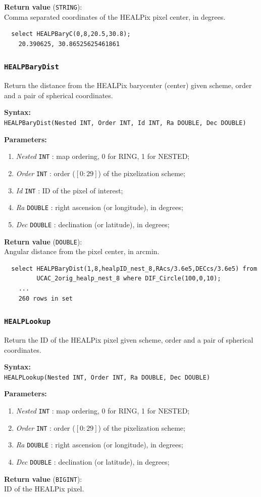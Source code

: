 \documentclass[10pt,titlepage]{article}
\newcommand{\syntax}[1]
{
  \bigskip
  \noindent
  \textbf{Syntax:} \\ 
  \indent \texttt{#1}
}
\newenvironment{parameters}
{
  \medskip
  \noindent
  \textbf{Parameters:}
  \begin{enumerate}
}
{
  \end{enumerate}
}
\newcommand{\param}[2]
{
  \item \textit{#1} \texttt{#2} 
}
\newcommand{\return}[1]
{
  \medskip
  \noindent
  \textbf{Return value} (\texttt{#1}): \\
  \indent
}
\newcommand{\example}
{
\medskip
\noindent{\textbf{Example:}}
}
\begin{document}
\return{STRING} Comma separated coordinates of the HEALPix pixel center, in
  degrees.

\example
%
\begin{verbatim}
  select HEALPBaryC(0,8,20.5,30.8);
    20.390625, 30.86525625461861
\end{verbatim}
%
%

\subsubsection{{\tt HEALPBaryDist}}
Return the distance from the HEALPix barycenter (center) given scheme,
order and a pair of spherical coordinates.

\syntax{HEALPBaryDist(Nested INT, Order INT, Id INT, Ra DOUBLE, Dec DOUBLE)}

\begin{parameters}
  \param{Nested}{INT}: map ordering, 0 for RING, 1 for NESTED;
  \param{Order}{INT}: order ($[0:29]$) of the pixelization scheme;
  \param{Id}{INT}: ID of the pixel of interest;
  \param{Ra}{DOUBLE}: right ascension (or longitude), in degrees;
  \param{Dec}{DOUBLE}: declination (or latitude), in degrees;
\end{parameters}

\return{DOUBLE} Angular distance from the pixel center, in arcmin.

\example
%
\begin{verbatim}
  select HEALPBaryDist(1,8,healpID_nest_8,RAcs/3.6e5,DECcs/3.6e5) from
         UCAC_2orig_healp_nest_8 where DIF_Circle(100,0,10);
    ...
    260 rows in set
\end{verbatim}
%
%

\subsubsection{{\tt HEALPLookup}}
Return the ID of the HEALPix pixel given scheme, order and a pair of
spherical coordinates.

\syntax{HEALPLookup(Nested INT, Order INT, Ra DOUBLE, Dec DOUBLE)}

\begin{parameters}
  \param{Nested}{INT}: map ordering, 0 for RING, 1 for NESTED;
  \param{Order}{INT}: order ($[0:29]$) of the pixelization scheme;
  \param{Ra}{DOUBLE}: right ascension (or longitude), in degrees;
  \param{Dec}{DOUBLE}: declination (or latitude), in degrees;
\end{parameters}

\return{BIGINT} ID of the HEALPix pixel.
\end{document}
